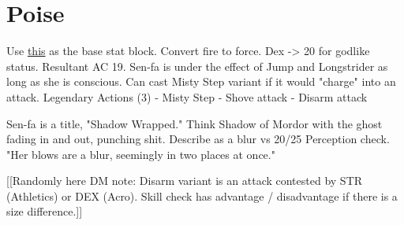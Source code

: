 \section{Poise}\label{sec:poise}

Use \href{https://i.imgur.com/HIvPzSj.jpg}{this} as the base stat block.
Convert fire to force.
Dex -> 20 for godlike status.
Resultant AC 19.
Sen-fa is under the effect of Jump and Longstrider as long as she is conscious.
Can cast Misty Step variant if it would "charge" into an attack.
Legendary Actions (3)
- Misty Step
- Shove attack
- Disarm attack

Sen-fa is a title, "Shadow Wrapped."
Think Shadow of Mordor with the ghost fading in and out, punching shit.
Describe as a blur vs 20/25 Perception check.
"Her blows are a blur, seemingly in two places at once."

[[Randomly here DM note:
  Disarm variant is an attack contested by STR (Athletics) or DEX (Acro).
  Skill check has advantage / disadvantage if there is a size difference.]]
